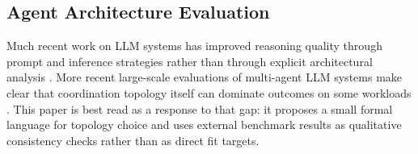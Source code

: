 \subsection{Agent Architecture Evaluation}

Much recent work on LLM systems has improved reasoning quality through prompt and inference strategies
rather than through explicit architectural analysis \cite{wei2022chain}. More recent large-scale
evaluations of multi-agent LLM systems make clear that coordination topology itself can dominate outcomes
on some workloads \cite{kim2025scaling}. This paper is best read as a response to that gap: it proposes a
small formal language for topology choice and uses external benchmark results as qualitative consistency
checks rather than as direct fit targets.
